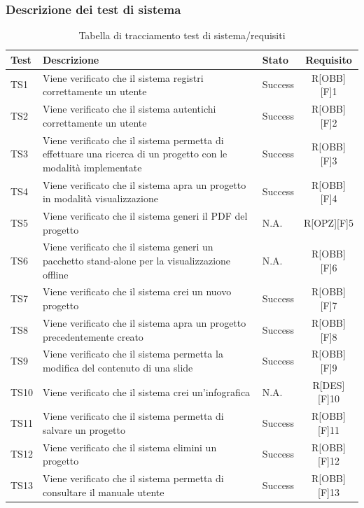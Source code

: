 \subsubsection{Descrizione dei test di sistema}
\begin{center}
	\begin{table}[h]
		\begin{tabular}{|l|p{}|l|c|}
			\toprule
			
			\textbf{Test} & \textbf{Descrizione} & \textbf{Stato} & \textbf{Requisito} \\
			
			\midrule
			TS1 & Viene verificato che il sistema registri correttamente un utente & Success & R[OBB][F]1\\ \midrule
			TS2 & Viene verificato che il sistema autentichi correttamente un utente & Success & R[OBB][F]2\\  \midrule
			TS3	& Viene verificato che il sistema permetta di effettuare una ricerca di un progetto con le modalità implementate & Success & R[OBB][F]3\\ \midrule
			TS4	& Viene verificato che il sistema apra un progetto in modalità visualizzazione & Success & R[OBB][F]4\\ \midrule
			TS5 & Viene verificato che il sistema generi il PDF del progetto & N.A. & R[OPZ][F]5\\ \midrule
			TS6 & Viene verificato che il sistema generi un pacchetto stand-alone per la visualizzazione offline & N.A. & R[OBB][F]6\\ \midrule
			TS7 & Viene verificato che il sistema crei un nuovo progetto & Success & R[OBB][F]7\\ \midrule
			TS8 & Viene verificato che il sistema apra un progetto precedentemente creato & Success & R[OBB][F]8\\ \midrule
			TS9 & Viene verificato che il sistema permetta la modifica del contenuto di una \gls{slide} & Success & R[OBB][F]9\\ \midrule
			TS10 & Viene verificato che il sistema crei un'\gls{infografica} & N.A. & R[DES][F]10\\ \midrule
			TS11 & Viene verificato che il sistema permetta di salvare un progetto & Success & R[OBB][F]11\\ \midrule
			TS12 & Viene verificato che il sistema elimini un progetto & Success & R[OBB][F]12\\ \midrule
			TS13 & Viene verificato che il sistema permetta di consultare il manuale utente & Success & R[OBB][F]13\\
			
						
			\bottomrule
			
		\end{tabular}
		\caption{Tabella di tracciamento test di sistema/requisiti}
		
	\end{table}
	
\end{center}

